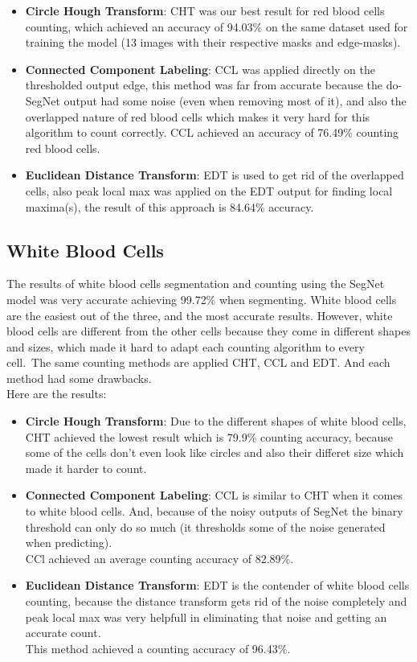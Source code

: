 \begin{itemize}
  \item \textbf{Circle Hough Transform}: CHT was our best result for red blood cells counting, which achieved an accuracy of 94.03\% on the same dataset used for training the model (13 images with their respective masks and edge-masks).
  \item \textbf{Connected Component Labeling}: CCL was applied directly on the thresholded output edge, this method was far from accurate because the do-SegNet output had some noise (even when removing most of it), and also the overlapped nature of red blood cells which makes it very hard for this algorithm to count correctly. CCL achieved an accuracy of 76.49\% counting red blood cells.
  \item \textbf{Euclidean Distance Transform}: EDT is used to get rid of the overlapped cells, also peak local max was applied on the EDT output for finding local maxima(s), the result of this approach is 84.64\% accuracy.
\end{itemize}



\subsection{White Blood Cells}
\hspace{\parindent}
The results of white blood cells segmentation and counting using the SegNet model was very accurate achieving 99.72\% when segmenting.
White blood cells are the easiest out of the three, and the most accurate results.
However, white blood cells are different from the other cells because they come in different shapes and sizes, which made it hard to adapt each counting algorithm to every cell.\
The same counting methods are applied CHT, CCL and EDT. And each method had some drawbacks.\\
Here are the results:

\begin{itemize}
  \item \textbf{Circle Hough Transform}: Due to the different shapes of white blood cells, CHT achieved the lowest result which is 79.9\% counting accuracy, because some of the cells don't even look like circles and also their differet size which made it harder to count.
  \item \textbf{Connected Component Labeling}: CCL is similar to CHT when it comes to white blood cells. And, because of the noisy outputs of SegNet the binary threshold can only do so much (it thresholds some of the noise generated when predicting).\\
    CCl achieved an average counting accuracy of 82.89\%.
  \item \textbf{Euclidean Distance Transform}: EDT is the contender of white blood cells counting, because the distance transform gets rid of the noise completely and peak local max was very helpfull in eliminating that noise and getting an accurate count.\\
    This method achieved a counting accuracy of 96.43\%.
\end{itemize}


